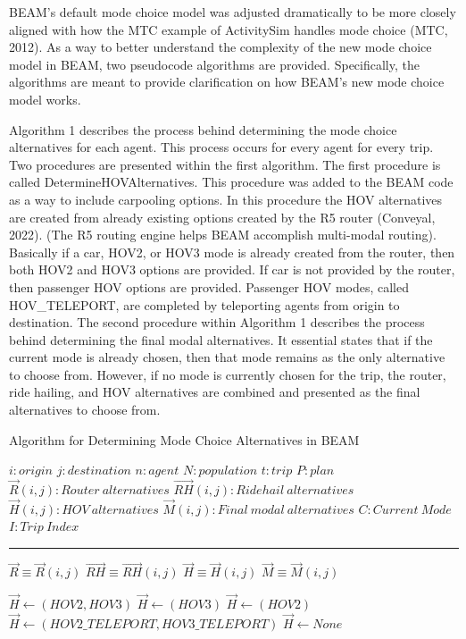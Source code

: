 \documentclass[fancy, masters]{byuthesis}
\begin{document}
BEAM's default mode choice model was adjusted dramatically to be more closely aligned with how the MTC example of ActivitySim handles mode choice (MTC, 2012). As a way to better understand the complexity of the new mode choice model in BEAM, two pseudocode algorithms are provided. Specifically, the algorithms are meant to provide clarification on how BEAM's new mode choice model works.

Algorithm 1 describes the process behind determining the mode choice alternatives for each agent. This process occurs for every agent for every trip. Two procedures are presented within the first algorithm. The first procedure is called DetermineHOVAlternatives. This procedure was added to the BEAM code as a way to include carpooling options. In this procedure the HOV alternatives are created from already existing options created by the R5 router (Conveyal, 2022). (The R5 routing engine helps BEAM accomplish multi-modal routing). Basically if a car, HOV2, or HOV3 mode is already created from the router, then both HOV2 and HOV3 options are provided. If car is not provided by the router, then passenger HOV options are provided. Passenger HOV modes, called HOV\_TELEPORT, are completed by teleporting agents from origin to destination. The second procedure within Algorithm 1 describes the process behind determining the final modal alternatives. It essential states that if the current mode is already chosen, then that mode remains as the only alternative to choose from. However, if no mode is currently chosen for the trip, the router, ride hailing, and HOV alternatives are combined and presented as the final alternatives to choose from.

\begin{algorithm} [tph]
\caption{Algorithm for Determining Mode Choice Alternatives in BEAM}
\begin{algorithmic}[1]
\Require
\State $i : origin$
\State $j : destination$
\State $n: agent$
\State $N: population$
\State $t : trip $
\State $P : plan$
\State $\vec{R}(i,j) : Router\: alternatives$
\State $\vec{RH}(i,j) : Ridehail\:alternatives$
\State $\vec{H}(i,j) : HOV\:alternatives$
\State $\vec{M}(i,j) : Final\:modal\:alternatives$
\State $C : Current\:Mode$
\State $I : Trip\:Index$
\vspace{4pt}\hrule\vspace{5pt}

\State $\vec{R} \equiv \vec{R}(i,j)$
\State $\vec{RH} \equiv \vec{RH}(i,j)$
\State $\vec{H} \equiv \vec{H}(i,j)$
\State $\vec{M} \equiv \vec{M}(i,j)$

    \State $\vec{H} \gets (HOV2,HOV3)$
    \State $\vec{H} \gets (HOV3)$
    \State $\vec{H} \gets (HOV2)$
    \State $\vec{H} \gets (HOV2\_TELEPORT, HOV3\_TELEPORT)$
  \EndIf
\Else
  \State $\vec{H} \gets None$
\EndIf
\EndProcedure
\Statex
{}
\end{algorithmic}
\end{algorithm}
\end{document}
